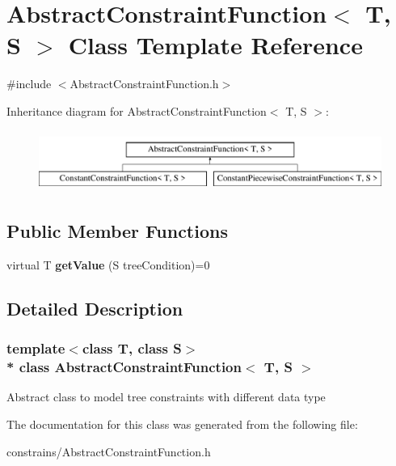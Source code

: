 \hypertarget{class_abstract_constraint_function}{}\section{Abstract\+Constraint\+Function$<$ T, S $>$ Class Template Reference}
\label{class_abstract_constraint_function}


{\ttfamily \#include $<$Abstract\+Constraint\+Function.\+h$>$}

Inheritance diagram for Abstract\+Constraint\+Function$<$ T, S $>$\+:\begin{figure}[H]
\begin{center}
\leavevmode
\includegraphics[height=2.000000cm]{dc/d7e/class_abstract_constraint_function}
\end{center}
\end{figure}
\subsection*{Public Member Functions}
\begin{DoxyCompactItemize}
\item 
virtual T {\bfseries get\+Value} (S tree\+Condition)=0\hypertarget{class_abstract_constraint_function_a93beb642087a3dfb45da51a57b3cdbc9}{}\label{class_abstract_constraint_function_a93beb642087a3dfb45da51a57b3cdbc9}

\end{DoxyCompactItemize}


\subsection{Detailed Description}
\subsubsection*{template$<$class T, class S$>$\\*
class Abstract\+Constraint\+Function$<$ T, S $>$}

Abstract class to model tree constraints with different data type 

The documentation for this class was generated from the following file\+:\begin{DoxyCompactItemize}
\item 
constrains/Abstract\+Constraint\+Function.\+h\end{DoxyCompactItemize}
